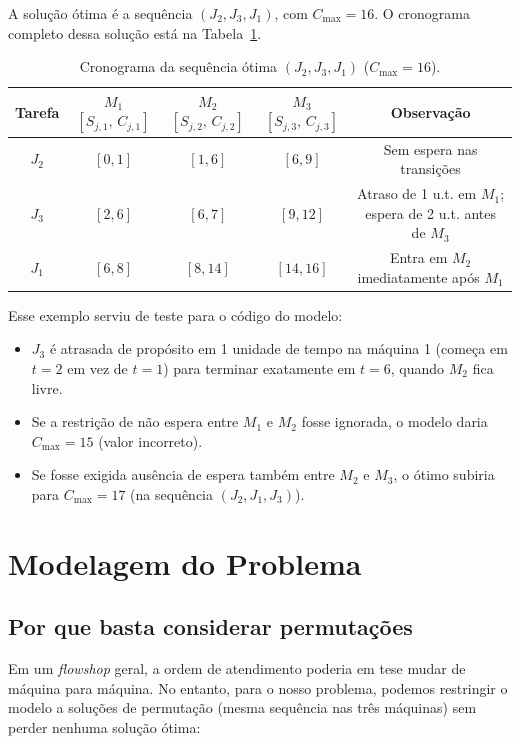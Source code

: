 \documentclass[11pt,a4paper]{article}
\begin{document}
A solução ótima é a sequência \textbf{$(J_2, J_3, J_1)$}, com \textbf{$C_{\max} = 16$}. O cronograma completo dessa solução está na Tabela~\ref{tab:exemplo_cronograma}.

\begin{table}[H]
\centering
\caption{Cronograma da sequência ótima $(J_2, J_3, J_1)$ ($C_{\max} = 16$).}
\label{tab:exemplo_cronograma}
\begin{tabular}{@{}ccccc@{}}
\toprule
Tarefa & $M_1$ $[S_{j,1},\, C_{j,1}]$ & $M_2$ $[S_{j,2},\, C_{j,2}]$ & $M_3$ $[S_{j,3},\, C_{j,3}]$ & Observação \\ \midrule
$J_2$ & $[0, 1]$ & $[1, 6]$ & $[6, 9]$ & Sem espera nas transições \\
$J_3$ & $[2, 6]$ & $[6, 7]$ & $[9, 12]$ & Atraso de 1 u.t. em $M_1$; espera de 2 u.t. antes de $M_3$ \\
$J_1$ & $[6, 8]$ & $[8, 14]$ & $[14, 16]$ & Entra em $M_2$ imediatamente após $M_1$ \\ \bottomrule
\end{tabular}
\end{table}

Esse exemplo serviu de teste para o código do modelo:
\begin{itemize}
    \item $J_3$ é atrasada de propósito em 1 unidade de tempo na máquina 1 (começa em $t = 2$ em vez de $t = 1$) para terminar exatamente em $t = 6$, quando $M_2$ fica livre.
    \item Se a restrição de não espera entre $M_1$ e $M_2$ fosse ignorada, o modelo daria $C_{\max} = 15$ (valor incorreto).
    \item Se fosse exigida ausência de espera também entre $M_2$ e $M_3$, o ótimo subiria para $C_{\max} = 17$ (na sequência $(J_2, J_1, J_3)$).
\end{itemize}


\section{Modelagem do Problema}
\label{sec:modelagem}

\subsection{Por que basta considerar permutações}
Em um \textit{flowshop} geral, a ordem de atendimento poderia em tese mudar de máquina para máquina. No entanto, para o nosso problema, podemos restringir o modelo a soluções de permutação (mesma sequência nas três máquinas) sem perder nenhuma solução ótima:
\end{document}
